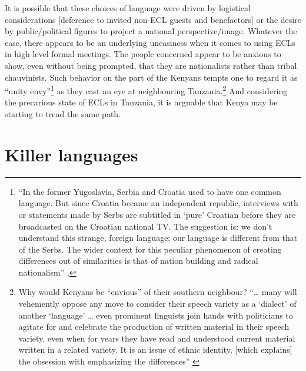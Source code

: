 \documentclass[output=paper,colorlinks,citecolor=brown]{langscibook}
\begin{document}
It is possible that these choices of language were driven by logistical considerations [deference to invited non-ECL guests and benefactors] or the desire by public\slash political figures to project a national perspective\slash image. Whatever the case, there appears to be an underlying uneasiness when it comes to using ECLs in high level formal meetings. The people concerned appear to be anxious to show, even without being prompted, that they are nationalists rather than tribal chauvinists. Such behavior on the part of the Kenyans tempts one to regard it as “unity envy”\footnote{“In the former Yugoslavia, Serbia and Croatia used to have one common language. But since Croatia became an independent republic, interviews with or statements made by Serbs are subtitled in ‘pure’ Croatian before they are broadcasted on the Croatian national TV. The suggestion is: we don’t understand this strange, foreign language; our language is different from that of the Serbs. The wider context for this peculiar phenomenon of creating differences out of similarities is that of nation building and radical nationalism” \citep[1]{Blommaert2014}.} as they cast an eye at neighbouring Tanzania.\footnote{Why would Kenyans be “envious” of their southern neighbour?  “… many will vehemently oppose any move to consider their speech variety as a ‘dialect’ of another ‘language’ … even prominent linguists join hands with politicians to agitate for and celebrate the production of written material in their speech variety, even when for years they have read and understood current material written in a related variety. It is an issue of ethnic identity, [which explains] the obsession with emphasizing the differences”  \citep[244]{Kioko2017}}  And considering the precarious state of ECLs in Tanzania, it is arguable that Kenya may be starting to tread the same path.

\section{Killer languages}\label{sec:kioko:5}
\end{document}
